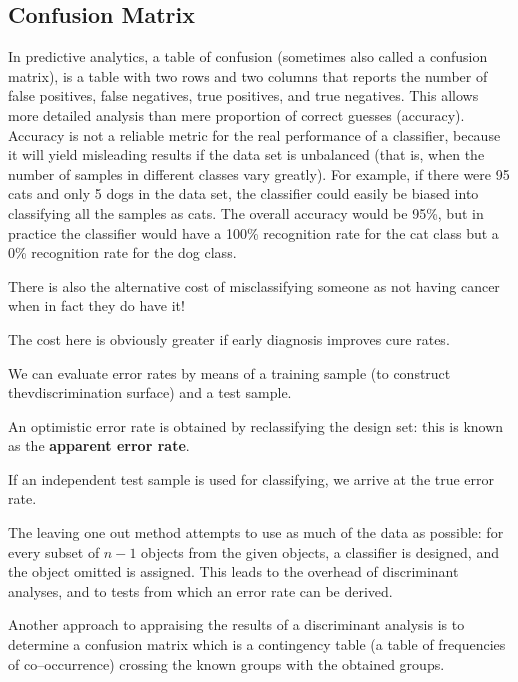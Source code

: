 \documentclass[12pt]{article} %
\begin{document}

\subsection*{Confusion Matrix}

In predictive analytics, a table of confusion (sometimes also called a confusion matrix), is a table with two rows and two columns that reports the number of false positives, false negatives, true positives, and true negatives. This allows more detailed analysis than mere proportion of correct guesses (accuracy). Accuracy is not a reliable metric for the real performance of a classifier, because it will yield misleading results if the data set is unbalanced (that is, when the number of samples in different classes vary greatly). For example, if there were 95 cats and only 5 dogs in the data set, the classifier could easily be biased into classifying all the samples as cats. The overall accuracy would be 95\%, but  in practice the classifier would have a 100\% recognition rate for the cat class but a 0\% recognition rate for the dog class.


There is also the alternative cost of misclassifying someone as not having cancer when in fact they do have it! 

The cost here is obviously greater if early diagnosis improves cure rates.


We can evaluate error rates by means of a training sample (to construct thevdiscrimination surface) and a test sample.

An optimistic error rate is obtained by reclassifying the design set: this is known as the \textbf{apparent error rate}.

If an independent test sample is used for classifying, we arrive at the true error rate.

The leaving one out method attempts to use as much of the data as possible: for every subset of $n-1$ objects from the given objects, a classifier is designed, 
and the object omitted is assigned. This leads to the overhead of discriminant analyses, and to tests from which an error rate can be derived.

Another approach to appraising the results of a discriminant analysis is to determine a confusion matrix which is a contingency table (a table of frequencies of co–occurrence) crossing the known groups with the obtained groups.
\end{document}
